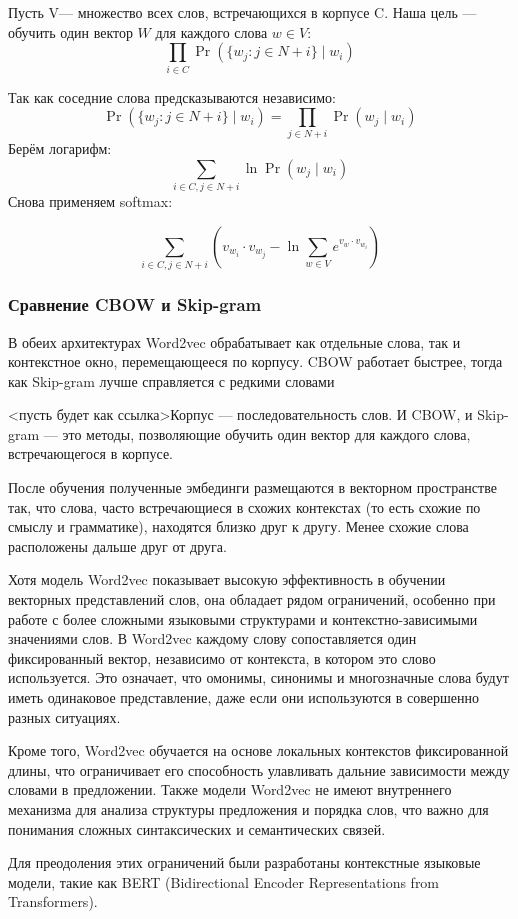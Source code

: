 Пусть V— множество всех слов, встречающихся в корпусе C.
Наша цель — обучить один вектор  $W $ для каждого слова ${\displaystyle w\in V}:$
\begin{equation}
\prod_{i \in C} \Pr(\{w_j : j \in N+i\} \mid w_i)
\end{equation}

Так как соседние слова предсказываются независимо:
\begin{equation}
\Pr(\{w_j : j \in N+i\} \mid w_i) = \prod_{j \in N+i} \Pr(w_j \mid w_i)
\end{equation}
Берём логарифм:
\begin{equation}
\sum_{i \in C, j \in N+i} \ln \Pr(w_j \mid w_i)
\end{equation}
Снова применяем softmax:

\begin{equation}
\sum_{i \in C, j \in N+i} \left( v_{w_i} \cdot v_{w_j} - \ln \sum_{w \in V} e^{v_w \cdot v_{w_i}} \right)
\end{equation}
		

\subsubsection{Сравнение CBOW и Skip-gram}


В обеих архитектурах Word2vec обрабатывает как отдельные слова, так и контекстное окно, перемещающееся по корпусу.
CBOW работает быстрее, тогда как Skip-gram лучше справляется с редкими словами






<пусть будет как ссылка>Корпус  —  последовательность слов. И CBOW, и Skip-gram — это методы, позволяющие обучить один вектор для каждого слова, встречающегося в корпусе.


После обучения полученные эмбединги размещаются в векторном пространстве так, что слова, часто встречающиеся в схожих контекстах (то есть схожие по смыслу и грамматике), находятся близко друг к другу. Менее схожие слова расположены дальше друг от друга.


Хотя модель Word2vec показывает высокую эффективность в обучении векторных представлений слов, она обладает рядом ограничений, особенно при работе с более сложными языковыми структурами и контекстно-зависимыми значениями слов. В Word2vec каждому слову сопоставляется один фиксированный вектор, независимо от контекста, в котором это слово используется. Это означает, что омонимы, синонимы и многозначные слова будут иметь одинаковое представление, даже если они используются в совершенно разных ситуациях.

Кроме того, Word2vec обучается на основе локальных контекстов фиксированной длины, что ограничивает его способность улавливать дальние зависимости между словами в предложении. Также модели Word2vec не имеют внутреннего механизма для анализа структуры предложения и порядка слов, что важно для понимания сложных синтаксических и семантических связей.

Для преодоления этих ограничений были разработаны контекстные языковые модели, такие как BERT (Bidirectional Encoder Representations from Transformers). 